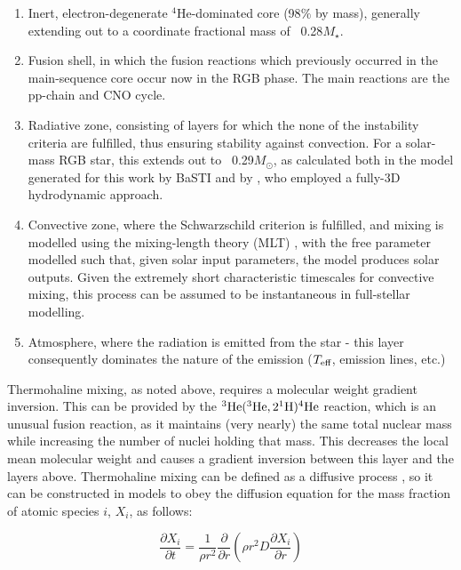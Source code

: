 \documentclass[12pt, a4paper]{report}
\begin{document}
\begin{enumerate}
\item Inert, electron-degenerate $^{4}$He-dominated core (98$\%$ by mass), generally extending out to a coordinate fractional mass of ~0.28$M_{\star}$.
\item Fusion shell, in which the fusion reactions which previously occurred in the main-sequence core occur now in the RGB phase. The main reactions are the pp-chain and CNO cycle.
\item Radiative zone, consisting of layers for which the none of the instability criteria are fulfilled, thus ensuring stability against convection. For a solar-mass RGB star, this extends out to ~0.29$M_{\odot}$, as calculated both in the model generated for this work by BaSTI  and by \cite{2006Sci...314.1580E}, who employed a fully-3D hydrodynamic approach.
\item Convective zone, where the Schwarzschild criterion is fulfilled, and mixing is modelled using the mixing-length theory (MLT) \citep{2017RSOS....470192S}, with the free parameter modelled such that, given solar input parameters, the model produces solar outputs. Given the extremely short characteristic timescales for convective mixing, this process can be assumed to be instantaneous in full-stellar modelling.
\item Atmosphere, where the radiation is emitted from the star - this layer consequently dominates the nature of the emission ($T_{\textnormal{eff}}$, emission lines, etc.)
\end{enumerate}

Thermohaline mixing, as noted above, requires a molecular weight gradient inversion. This can be provided by the $^{3}\textnormal{He}(^{3}\textnormal{He},2^{1}\textnormal{H})^{4}\textnormal{He}$ reaction, which is an unusual fusion reaction, as it maintains (very nearly) the same total nuclear mass while increasing the number of nuclei holding that mass. This decreases the local mean molecular weight and causes a gradient inversion between this layer and the layers above. Thermohaline mixing can be defined as a diffusive process \citep{1980A&A....91..175K}, so it can be constructed in models to obey the diffusion equation for the mass fraction of atomic species $i$, $X_{i}$, as follows:

\begin{equation}
\frac{\partial X_{i}}{\partial t} = \frac{1}{\rho r^{2}}\frac{\partial}{\partial r} \left( \rho r^{2} D \frac{\partial X_{i}}{\partial r} \right)
\label{diffusion_eq}
\end{equation}
\end{document}
